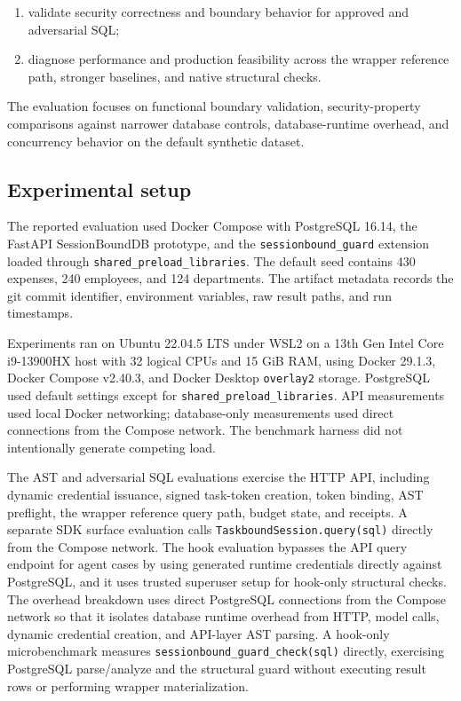\documentclass[journal]{IEEEtran}
\providecommand{\tightlist}{%
  \setlength{\itemsep}{0pt}\setlength{\parskip}{0pt}}
\begin{document}
\begin{enumerate}
\def\labelenumi{\arabic{enumi}.}
\tightlist
\item
  validate security correctness and boundary behavior for approved and
  adversarial SQL;
\item
  diagnose performance and production feasibility across the wrapper
  reference path, stronger baselines, and native structural checks.
\end{enumerate}

The evaluation focuses on functional boundary validation,
security-property comparisons against narrower database controls,
database-runtime overhead, and concurrency behavior on the default
synthetic dataset.

\hypertarget{experimental-setup}{%
\subsection{Experimental setup}\label{experimental-setup}}

The reported evaluation used Docker Compose with PostgreSQL 16.14, the
FastAPI SessionBoundDB prototype, and the
\texttt{sessionbound\_guard} extension loaded through
\texttt{shared\_preload\_libraries}. The default seed contains 430
expenses, 240 employees, and 124 departments. The artifact metadata
records the git commit identifier, environment variables, raw result
paths, and run timestamps.

Experiments ran on Ubuntu 22.04.5 LTS under WSL2 on a 13th Gen Intel
Core i9-13900HX host with 32 logical CPUs and 15 GiB RAM, using Docker
29.1.3, Docker Compose v2.40.3, and Docker Desktop \texttt{overlay2}
storage. PostgreSQL used default settings except for
\texttt{shared\_preload\_libraries}. API measurements used local Docker
networking; database-only measurements used direct connections from the
Compose network. The benchmark harness did not intentionally generate
competing load.

The AST and adversarial SQL evaluations exercise the HTTP API, including
dynamic credential issuance, signed task-token creation, token binding,
AST preflight, the wrapper reference query path, budget state, and receipts. A
separate SDK surface evaluation calls \texttt{TaskboundSession.query(sql)}
directly from the Compose network. The hook evaluation bypasses the API
query endpoint for agent cases by using generated runtime credentials
directly against PostgreSQL, and it uses trusted superuser setup for
hook-only structural checks. The overhead breakdown uses direct
PostgreSQL connections from the Compose network so that it isolates
database runtime overhead from HTTP, model calls, dynamic credential
creation, and API-layer AST parsing. A hook-only microbenchmark measures
\texttt{sessionbound\_guard\_check(sql)} directly, exercising PostgreSQL
parse/analyze and the structural guard without executing result rows or
performing wrapper materialization.
\end{document}
